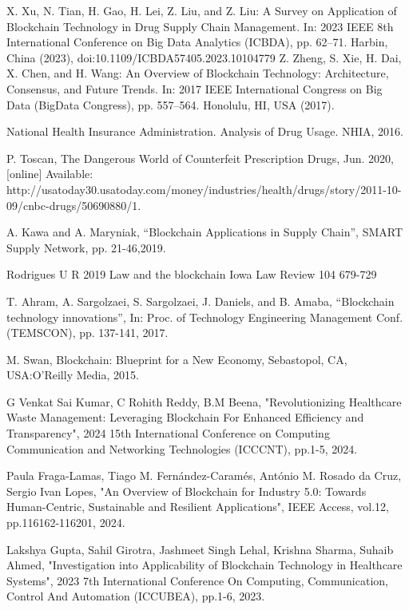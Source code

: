 \documentclass[conference]{IEEEtran}
\begin{document}
\begin{thebibliography}{00}
X. Xu, N. Tian, H. Gao, H. Lei, Z. Liu, and Z. Liu: A Survey on Application of Blockchain Technology 
in Drug Supply Chain Management. In: 2023 IEEE 8th International Conference on Big Data Analytics 
(ICBDA), pp. 62--71. Harbin, China (2023), doi:10.1109/ICBDA57405.2023.10104779
Z. Zheng, S. Xie, H. Dai, X. Chen, and H. Wang: An Overview of Blockchain Technology: 
Architecture, Consensus, and Future Trends. In: 2017 IEEE International Congress 
on Big Data (BigData Congress), pp. 557--564. Honolulu, HI, USA (2017).

National Health Insurance Administration. Analysis of Drug Usage. NHIA, 2016. 

P. Toscan, The Dangerous World of Counterfeit Prescription Drugs, Jun. 2020, [online] Available: http://usatoday30.usatoday.com/money/industries/health/drugs/story/2011-10-09/cnbc-drugs/50690880/1.


A. Kawa and A. Maryniak, “Blockchain
Applications in Supply Chain”, SMART Supply
Network, pp. 21-46,2019.


Rodrigues U R 2019 Law and the blockchain Iowa Law Review 104 679-729

T. Ahram, A. Sargolzaei, S. Sargolzaei, J.
Daniels, and B. Amaba, “Blockchain technology
innovations”, In: Proc. of Technology 
Engineering Management Conf. (TEMSCON),
pp. 137-141, 2017.


M. Swan, Blockchain: Blueprint for a New Economy, Sebastopol, CA, USA:O’Reilly Media, 2015. 


G Venkat Sai Kumar, C Rohith Reddy, B.M Beena, "Revolutionizing Healthcare Waste Management: Leveraging Blockchain For Enhanced Efficiency and Transparency", 2024 15th International Conference on Computing Communication and Networking Technologies (ICCCNT), pp.1-5, 2024.


Paula Fraga-Lamas, Tiago M. Fernández-Caramés, António M. Rosado da Cruz, Sergio Ivan Lopes, "An Overview of Blockchain for Industry 5.0: Towards Human-Centric, Sustainable and Resilient Applications", IEEE Access, vol.12, pp.116162-116201, 2024.


Lakshya Gupta, Sahil Girotra, Jashmeet Singh Lehal, Krishna Sharma, Suhaib Ahmed, "Investigation into Applicability of Blockchain Technology in Healthcare Systems", 2023 7th International Conference On Computing, Communication, Control And Automation (ICCUBEA), pp.1-6, 2023.


\end{thebibliography}
\end{document}
